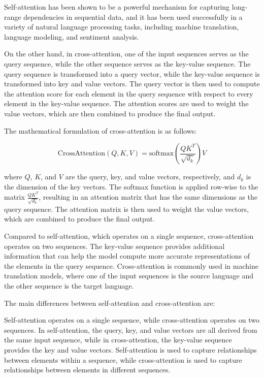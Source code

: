 Self-attention has been shown to be a powerful mechanism for capturing long-range dependencies in sequential data, and it has been used successfully in a variety of natural language processing tasks, including machine translation, language modeling, and sentiment analysis.

On the other hand, in cross-attention, one of the input sequences serves as the query sequence, while the other sequence serves as the key-value sequence. The query sequence is transformed into a query vector, while the key-value sequence is transformed into key and value vectors. The query vector is then used to compute the attention score for each element in the query sequence with respect to every element in the key-value sequence. The attention scores are used to weight the value vectors, which are then combined to produce the final output.

The mathematical formulation of cross-attention is as follows:

\begin{equation}
	\text{CrossAttention}(Q, K, V) = \text{softmax}\left(\frac{QK^T}{\sqrt{d_k}}\right)V
\end{equation}

where $Q$, $K$, and $V$ are the query, key, and value vectors, respectively, and $d_k$ is the dimension of the key vectors. The softmax function is applied row-wise to the matrix $\frac{QK^T}{\sqrt{d_k}}$, resulting in an attention matrix that has the same dimensions as the query sequence. The attention matrix is then used to weight the value vectors, which are combined to produce the final output.

Compared to self-attention, which operates on a single sequence, cross-attention operates on two sequences. The key-value sequence provides additional information that can help the model compute more accurate representations of the elements in the query sequence. Cross-attention is commonly used in machine translation models, where one of the input sequences is the source language and the other sequence is the target language.

The main differences between self-attention and cross-attention are:

Self-attention operates on a single sequence, while cross-attention operates on two sequences.
In self-attention, the query, key, and value vectors are all derived from the same input sequence, while in cross-attention, the key-value sequence provides the key and value vectors.
Self-attention is used to capture relationships between elements within a sequence, while cross-attention is used to capture relationships between elements in different sequences.

